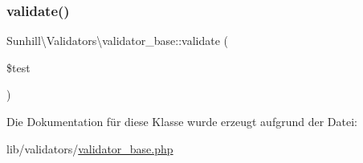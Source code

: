 \mbox{\label{classSunhill_1_1Validators_1_1validator__base_a897226623a9d3e610cb828246d2a59f8}} 
\subsubsection{\texorpdfstring{validate()}{validate()}}
{\footnotesize\ttfamily Sunhill\textbackslash{}\+Validators\textbackslash{}validator\+\_\+base\+::validate (\begin{DoxyParamCaption}\item[{}]{\$test }\end{DoxyParamCaption})}



Die Dokumentation für diese Klasse wurde erzeugt aufgrund der Datei\+:\begin{DoxyCompactItemize}
\item 
lib/validators/\hyperlink{validator__base_8php}{validator\+\_\+base.\+php}\end{DoxyCompactItemize}
